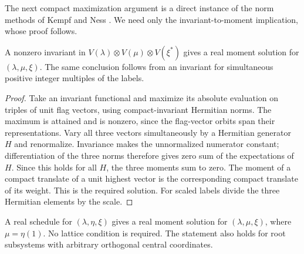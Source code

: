 The next compact maximization argument is a direct instance of the
norm methods of Kempf and Ness \cite{KN79}. We need only the
invariant-to-moment implication, whose proof follows.

\begin{lemma}\label{lem:invariant-moment}
A nonzero invariant in
$V(\lambda)\otimes V(\mu)\otimes V(\xi^*)$ gives a real moment
solution for $(\lambda,\mu,\xi)$.  The same conclusion follows from
an invariant for simultaneous positive integer multiples of the labels.
\end{lemma}

\begin{proof}
Take an invariant functional and maximize its absolute evaluation on
triples of unit flag vectors, using compact-invariant Hermitian norms.
The maximum is attained and is nonzero, since the flag-vector orbits
span their representations.  Vary all three vectors simultaneously
by a Hermitian generator $H$ and renormalize.  Invariance makes the
unnormalized numerator constant; differentiation of the three norms
therefore gives zero sum of the expectations of $H$.  Since this
holds for all $H$, the three moments sum to zero.  The moment of a
compact translate of a unit highest vector is the corresponding
compact translate of its weight.  This is the required solution.
For scaled labels divide the three Hermitian elements by the scale.
\end{proof}

\begin{lemma}\label{lem:schedule-moment}
A real schedule for $(\lambda,\eta,\xi)$ gives a real moment
solution for $(\lambda,\mu,\xi)$, where $\mu=\eta(1)$.
No lattice condition is required.  The statement also holds for
root subsystems with arbitrary orthogonal central coordinates.
\end{lemma}

